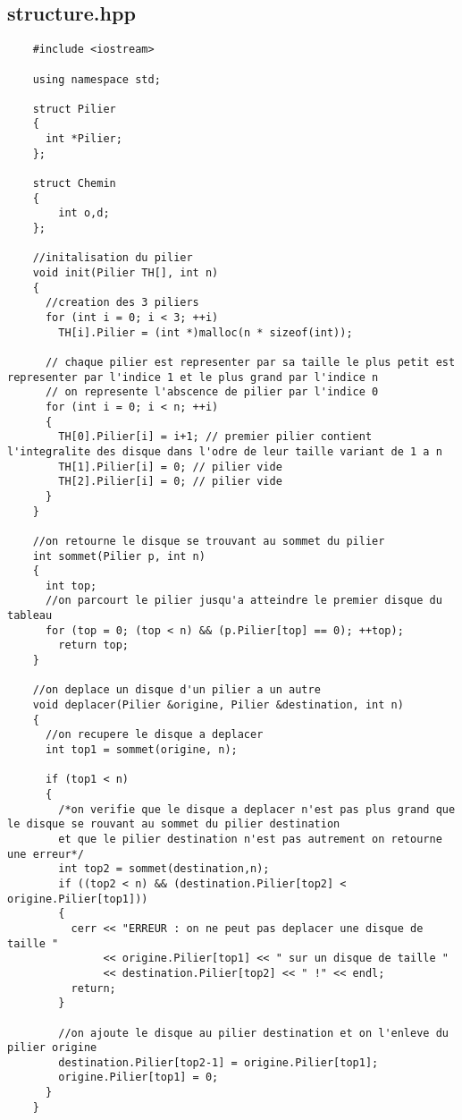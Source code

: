 \subsection{structure.hpp}
\begin{verbatim}
    #include <iostream>

    using namespace std;
    
    struct Pilier
    {
      int *Pilier;
    };
    
    struct Chemin
    {
        int o,d;
    };
    
    //initalisation du pilier
    void init(Pilier TH[], int n)
    {
      //creation des 3 piliers
      for (int i = 0; i < 3; ++i)
        TH[i].Pilier = (int *)malloc(n * sizeof(int));
      
      // chaque pilier est representer par sa taille le plus petit est representer par l'indice 1 et le plus grand par l'indice n
      // on represente l'abscence de pilier par l'indice 0 
      for (int i = 0; i < n; ++i)
      {
        TH[0].Pilier[i] = i+1; // premier pilier contient l'integralite des disque dans l'odre de leur taille variant de 1 a n
        TH[1].Pilier[i] = 0; // pilier vide
        TH[2].Pilier[i] = 0; // pilier vide
      }
    }
    
    //on retourne le disque se trouvant au sommet du pilier
    int sommet(Pilier p, int n)
    {
      int top;
      //on parcourt le pilier jusqu'a atteindre le premier disque du tableau 
      for (top = 0; (top < n) && (p.Pilier[top] == 0); ++top);
        return top;
    }
    
    //on deplace un disque d'un pilier a un autre
    void deplacer(Pilier &origine, Pilier &destination, int n)
    {
      //on recupere le disque a deplacer
      int top1 = sommet(origine, n);
    
      if (top1 < n)
      {
        /*on verifie que le disque a deplacer n'est pas plus grand que le disque se rouvant au sommet du pilier destination
        et que le pilier destination n'est pas autrement on retourne une erreur*/
        int top2 = sommet(destination,n);
        if ((top2 < n) && (destination.Pilier[top2] < origine.Pilier[top1])) 
        {
          cerr << "ERREUR : on ne peut pas deplacer une disque de taille "
               << origine.Pilier[top1] << " sur un disque de taille "
               << destination.Pilier[top2] << " !" << endl;
          return;
        }
    
        //on ajoute le disque au pilier destination et on l'enleve du pilier origine
        destination.Pilier[top2-1] = origine.Pilier[top1];
        origine.Pilier[top1] = 0;
      }
    }
    

\end{verbatim}
